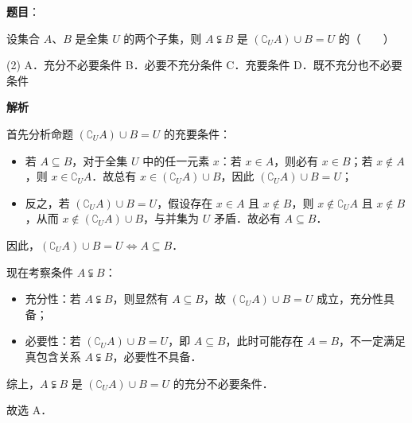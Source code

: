 \begin{answer}

\textbf{题目}：

设集合 $A$、$B$ 是全集 $U$ 的两个子集，则 $A \subsetneqq B$ 是 $(\complement_U A) \cup B = U$ 的\mbox{（　　）}

\begin{gkopts}(2)
\task A．充分不必要条件
\task B．必要不充分条件
\task C．充要条件
\task D．既不充分也不必要条件
\end{gkopts}

\textbf{解析}

首先分析命题 $(\complement_U A) \cup B = U$ 的充要条件：
\begin{itemize}
\item 若 $A \subseteq B$，对于全集 $U$ 中的任一元素 $x$：若 $x \in A$，则必有 $x \in B$；若 $x \notin A$，则 $x \in \complement_U A$．故总有 $x \in (\complement_U A) \cup B$，因此 $(\complement_U A) \cup B = U$；
\item 反之，若 $(\complement_U A) \cup B = U$，假设存在 $x \in A$ 且 $x \notin B$，则 $x \notin \complement_U A$ 且 $x \notin B$，从而 $x \notin (\complement_U A) \cup B$，与并集为 $U$ 矛盾．故必有 $A \subseteq B$．
\end{itemize}
因此，$(\complement_U A) \cup B = U \iff A \subseteq B$．

现在考察条件 $A \subsetneqq B$：
\begin{itemize}
\item 充分性：若 $A \subsetneqq B$，则显然有 $A \subseteq B$，故 $(\complement_U A) \cup B = U$ 成立，充分性具备；
\item 必要性：若 $(\complement_U A) \cup B = U$，即 $A \subseteq B$，此时可能存在 $A = B$，不一定满足真包含关系 $A \subsetneqq B$，必要性不具备．
\end{itemize}

综上，$A \subsetneqq B$ 是 $(\complement_U A) \cup B = U$ 的充分不必要条件．

故选 A．


\end{answer}
